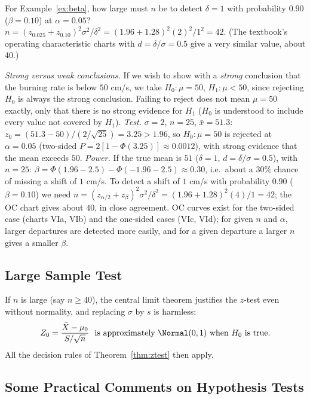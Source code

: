 \begin{example}
For Example~\ref{ex:beta}, how large must $n$ be to detect $\delta=1$ with probability $0.90$ ($\beta=0.10$) at $\alpha=0.05$? $n=(z_{0.025}+z_{0.10})^2\sigma^2/\delta^2=(1.96+1.28)^2(2)^2/1^2=42$. (The textbook's operating characteristic charts with $d=\delta/\sigma=0.5$ give a very similar value, about $40$.)
\end{example}

\begin{example}
\emph{Strong versus weak conclusions.} If we wish to show with a \emph{strong} conclusion that the burning rate is below $50$ cm/s, we take $H_0:\mu=50$, $H_1:\mu<50$, since rejecting $H_0$ is always the strong conclusion. Failing to reject does not mean $\mu=50$ exactly, only that there is no strong evidence for $H_1$ ($H_0$ is understood to include every value not covered by $H_1$).
\emph{Test.} $\sigma=2$, $n=25$, $\bar{x}=51.3$: $z_0=(51.3-50)/(2/\sqrt{25})=3.25>1.96$, so $H_0:\mu=50$ is rejected at $\alpha=0.05$ (two-sided $P=2[1-\Phi(3.25)]\approx0.0012$), with strong evidence that the mean exceeds $50$.
\emph{Power.} If the true mean is $51$ ($\delta=1$, $d=\delta/\sigma=0.5$), with $n=25$: $\beta=\Phi(1.96-2.5)-\Phi(-1.96-2.5)\approx0.30$, i.e.\ about a $30\%$ chance of missing a shift of $1$ cm/s. To detect a shift of $1$ cm/s with probability $0.90$ ($\beta=0.10$) we need $n=(z_{\alpha/2}+z_\beta)^2\sigma^2/\delta^2=(1.96+1.28)^2(4)/1=42$; the OC chart gives about $40$, in close agreement. OC curves exist for the two-sided case (charts VIa, VIb) and the one-sided cases (VIc, VId); for given $n$ and $\alpha$, larger departures are detected more easily, and for a given departure a larger $n$ gives a smaller $\beta$.
\end{example}

\subsection{Large Sample Test}

If $n$ is large (say $n\ge40$), the central limit theorem justifies the $z$-test even without normality, and replacing $\sigma$ by $s$ is harmless:
\[ Z_0=\frac{\bar{X}-\mu_0}{S/\sqrt n}\ \text{ is approximately }\Normal(0,1)\text{ when }H_0\text{ is true}. \]
All the decision rules of Theorem~\ref{thm:ztest} then apply.

\subsection{Some Practical Comments on Hypothesis Tests}\label{sec:practical}

